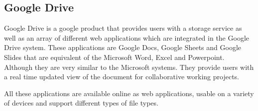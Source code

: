 \subsection{Google Drive}
Google Drive is a google product that provides users with a storage service as well as an array of different web applications which are integrated in the Google Drive system.
These applications are Google Docs, Google Sheets and Google Slides that are equivalent of the Microsoft Word, Excel and Powerpoint.
Although they are very similar to the Microsoft systems.
They provide users with a real time updated view of the document for collaborative working projects.

All these applications are available online as web applications, usable on a variety of devices and support different types of file types.\cite{GoogleDriveContents}
